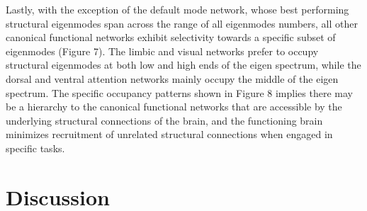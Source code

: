 \documentclass{article}
\begin{document}
Lastly, with the exception of the default mode network, whose best performing structural eigenmodes span across the range of all eigenmodes numbers, all other canonical functional networks exhibit selectivity towards a specific subset of eigenmodes (Figure 7). The limbic and visual networks prefer to occupy structural eigenmodes at both low and high ends of the eigen spectrum, while the dorsal and ventral attention networks mainly occupy the middle of the eigen spectrum. The specific occupancy patterns shown in Figure 8 implies there may be a hierarchy to the canonical functional networks that are accessible by the underlying structural connections of the brain, and the functioning brain minimizes recruitment of unrelated structural connections when engaged in specific tasks. 

\section{Discussion}

  
  
\end{document}
